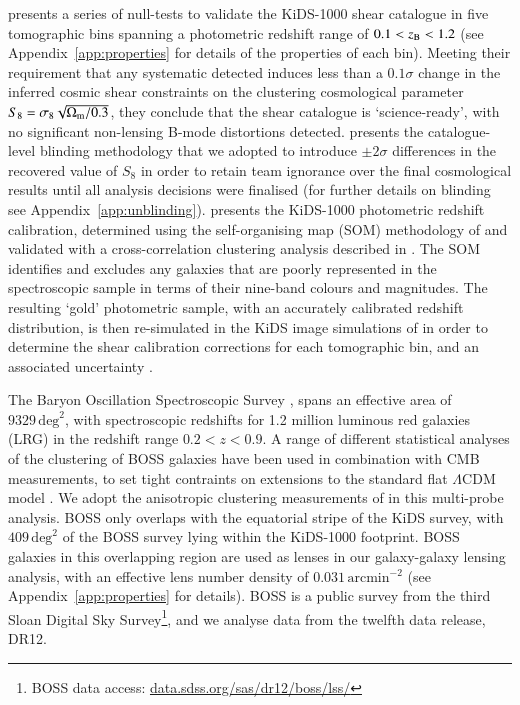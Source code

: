 \citet{giblin/etal:inprep} presents a series of null-tests to validate the KiDS-1000 shear catalogue in five tomographic bins spanning a 
photometric redshift range of $0.1 < z_{\rm B} < 1.2$ (see Appendix~\ref{app:properties} for details of the properties of each bin).  
Meeting their requirement that any systematic detected induces less than a $0.1\sigma$ change in the inferred 
cosmic shear constraints on the clustering cosmological parameter $S_8 = \sigma_8\sqrt{\Omega_{\rm m}/0.3}$, they conclude that the shear catalogue is `science-ready', with no significant non-lensing B-mode distortions detected.  \citet{kuijken/etal:2015} presents the catalogue-level blinding methodology that we adopted to introduce $\pm 2\sigma$ differences in the recovered value of $S_8$ in order
to retain team ignorance over the final cosmological results until all 
analysis decisions were finalised (for further details on blinding see Appendix~\ref{app:unblinding}).
\citet{hildebrandt/etal:inprep} presents the KiDS-1000 photometric redshift calibration, determined using the self-organising map (SOM) methodology of \citet{wright/etal:2020} and validated with a cross-correlation clustering analysis described in \citet{vandenbusch/etal:inprep}.
The SOM identifies and excludes any galaxies that are poorly represented in the spectroscopic sample in terms of their nine-band colours and magnitudes. The resulting `gold' photometric sample, with an accurately calibrated redshift distribution, is then re-simulated in the KiDS image simulations of \citet{kannawadi/etal:2019} in order to determine the shear calibration corrections for each tomographic bin, and an associated uncertainty \citep[see][for full details]{giblin/etal:inprep,hildebrandt/etal:inprep}.
 
The Baryon Oscillation Spectroscopic Survey
\citep[BOSS,][]{alam/etal:2015}, spans an effective area of $9329\,\mathrm{deg}^{2}$, with spectroscopic redshifts for 1.2 million luminous red
galaxies (LRG) in the redshift range $0.2<z<0.9$.   A range of
different statistical analyses of the clustering of BOSS galaxies have been used in combination with CMB
measurements, to set tight contraints on extensions to the standard
flat $\Lambda$CDM model \citep[see][and references
therein]{alam/etal:2017}.   We adopt the anisotropic clustering
measurements of \citet{sanchez/etal:2017} in this multi-probe analysis.
BOSS only overlaps with the equatorial stripe
of the KiDS survey, with $409\,\mathrm{deg}^{2}$ of the BOSS survey lying within
the KiDS-1000 footprint.  BOSS galaxies in this overlapping region are used as lenses in
our galaxy-galaxy lensing analysis, with an effective lens number density of $0.031\,\mathrm{arcmin}^{-2}$ (see Appendix~\ref{app:properties} for details).  BOSS is a public survey from the third Sloan
Digital Sky Survey\footnote{BOSS data access: \href{https://data.sdss.org/sas/dr12/boss/lss/}{data.sdss.org/sas/dr12/boss/lss/}}, and we analyse data from the twelfth data release, DR12. 

